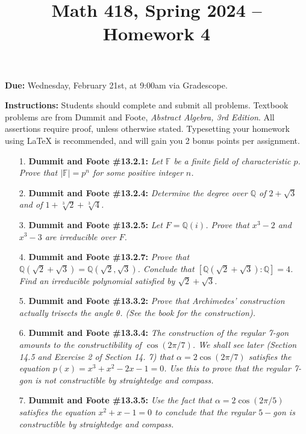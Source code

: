 \documentclass[12pt]{article}
\title{Math 418, Spring 2024 -- Homework 4}
\date{}
\newcommand{\Q}{\mathbb{Q}}
\newcommand{\F}{\mathbb{F}}
\begin{document}
 \maketitle
\vspace{-80pt}

\textbf{Due:} Wednesday, February 21st, at 9:00am via Gradescope.

\textbf{Instructions:} Students should complete and submit all problems. Textbook problems are from Dummit and Foote, \emph{Abstract Algebra, 3rd Edition}. All assertions require proof, unless otherwise stated. Typesetting your homework using LaTeX is recommended, and will gain you 2 bonus points per assignment.

\begin{enumerate}

\item[1.] \textbf{Dummit and Foote \#13.2.1:} \textit{Let $\F$ be a finite field of characteristic $p$. Prove that $|\F| = p^n$ for some positive integer $n$.}

\item[2.] \textbf{Dummit and Foote \#13.2.4:} \textit{Determine the degree over $\Q$ of $2 + \sqrt{3}$ and of $1 + \sqrt[3]{2} + \sqrt[3]{4}$.}

\item[3.] \textbf{Dummit and Foote \#13.2.5:} \textit{Let $F = \Q(i)$. Prove that $x^3 - 2$ and $x^3 - 3$ are irreducible over $F$.}

\item[4.] \textbf{Dummit and Foote \#13.2.7:} \textit{Prove that $\Q(\sqrt{2} + \sqrt{3}) = \Q(\sqrt{2}, \sqrt{3})$. Conclude that $[\Q(\sqrt{2} + \sqrt{3}) : \Q] = 4$. Find an irreducible polynomial satisfied by $\sqrt{2} + \sqrt{3}$.}

\item[5.] \textbf{Dummit and Foote \#13.3.2:} \textit{Prove that Archimedes' construction actually trisects the angle $\theta$. (See the book for the construction).}

\item[6.] \textbf{Dummit and Foote \#13.3.4:} \textit{The construction of the regular 7-gon amounts to the constructibility of $\cos(2\pi/7)$. We shall see later (Section 14.5 and Exercise 2 of Section 14. 7) that $\alpha = 2 \cos(2\pi/7)$ satisfies the equation $p(x) = x^3 + x^2 - 2x - 1 = 0$. Use this to prove that the regular 7-gon is not constructible by straightedge and compass.}

\item[7.] \textbf{Dummit and Foote \#13.3.5:} \textit{Use the fact that $\alpha = 2\cos(2\pi/5)$ satisfies the equation $x^2 + x - 1 = 0$ to conclude that the regular $5-$gon is constructible by straightedge and compass.}

\end{enumerate}
\end{document}
